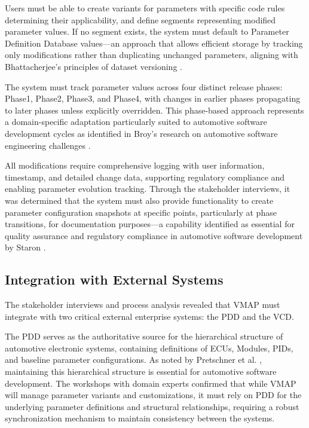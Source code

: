 Users must be able to create variants for parameters with specific code rules determining their applicability, and define segments representing modified parameter values. If no segment exists, the system must default to Parameter Definition Database values—an approach that allows efficient storage by tracking only modifications rather than duplicating unchanged parameters, aligning with Bhattacherjee's principles of dataset versioning \cite{bhattacherjee2015principles}.

The system must track parameter values across four distinct release phases: Phase1, Phase2, Phase3, and Phase4, with changes in earlier phases propagating to later phases unless explicitly overridden. This phase-based approach represents a domain-specific adaptation particularly suited to automotive software development cycles as identified in Broy's research on automotive software engineering challenges \cite{broy2006challenges}.

All modifications require comprehensive logging with user information, timestamp, and detailed change data, supporting regulatory compliance and enabling parameter evolution tracking. Through the stakeholder interviews, it was determined that the system must also provide functionality to create parameter configuration snapshots at specific points, particularly at phase transitions, for documentation purposes—a capability identified as essential for quality assurance and regulatory compliance in automotive software development by Staron \cite{staron2021automotive}.

\subsection{Integration with External Systems}
\label{subsec:integration-external-systems}

The stakeholder interviews and process analysis revealed that \ac{VMAP} must integrate with two critical external enterprise systems: the \ac{PDD} and the \ac{VCD}.

The \ac{PDD} serves as the authoritative source for the hierarchical structure of automotive electronic systems, containing definitions of \acp{ECU}, Modules, \acp{PID}, and baseline parameter configurations. As noted by Pretschner et al. \cite{pretschner2007software}, maintaining this hierarchical structure is essential for automotive software development. The workshops with domain experts confirmed that while \ac{VMAP} will manage parameter variants and customizations, it must rely on \ac{PDD} for the underlying parameter definitions and structural relationships, requiring a robust synchronization mechanism to maintain consistency between the systems.

